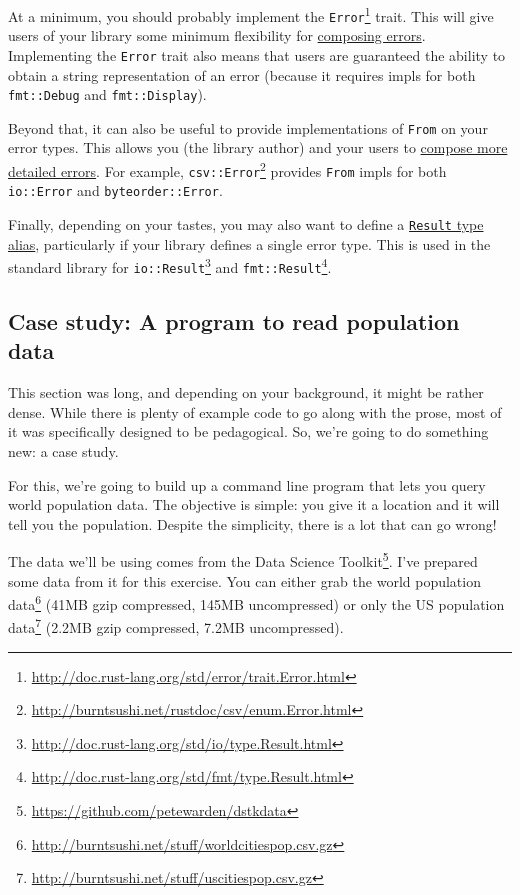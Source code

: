 \documentclass[a4paper,]{book}
\renewcommand{\href}[2]{#2\footnote{\url{#1}}}
\begin{document}
At a minimum, you should probably implement the
\href{http://doc.rust-lang.org/std/error/trait.Error.html}{\texttt{Error}}
trait. This will give users of your library some minimum flexibility for
\protect\hyperlink{the-real-try-macro}{composing errors}. Implementing
the \texttt{Error} trait also means that users are guaranteed the
ability to obtain a string representation of an error (because it
requires impls for both \texttt{fmt::Debug} and \texttt{fmt::Display}).

Beyond that, it can also be useful to provide implementations of
\texttt{From} on your error types. This allows you (the library author)
and your users to
\protect\hyperlink{composing-custom-error-types}{compose more detailed
errors}. For example,
\href{http://burntsushi.net/rustdoc/csv/enum.Error.html}{\texttt{csv::Error}}
provides \texttt{From} impls for both \texttt{io::Error} and
\texttt{byteorder::Error}.

Finally, depending on your tastes, you may also want to define a
\protect\hyperlink{the-result-type-alias-idiom}{\texttt{Result} type
alias}, particularly if your library defines a single error type. This
is used in the standard library for
\href{http://doc.rust-lang.org/std/io/type.Result.html}{\texttt{io::Result}}
and
\href{http://doc.rust-lang.org/std/fmt/type.Result.html}{\texttt{fmt::Result}}.

\hypertarget{case-study-a-program-to-read-population-data}{\subsection{Case
study: A program to read population
data}\label{case-study-a-program-to-read-population-data}}

This section was long, and depending on your background, it might be
rather dense. While there is plenty of example code to go along with the
prose, most of it was specifically designed to be pedagogical. So, we're
going to do something new: a case study.

For this, we're going to build up a command line program that lets you
query world population data. The objective is simple: you give it a
location and it will tell you the population. Despite the simplicity,
there is a lot that can go wrong!

The data we'll be using comes from the
\href{https://github.com/petewarden/dstkdata}{Data Science Toolkit}.
I've prepared some data from it for this exercise. You can either grab
the \href{http://burntsushi.net/stuff/worldcitiespop.csv.gz}{world
population data} (41MB gzip compressed, 145MB uncompressed) or only the
\href{http://burntsushi.net/stuff/uscitiespop.csv.gz}{US population
data} (2.2MB gzip compressed, 7.2MB uncompressed).
\end{document}
